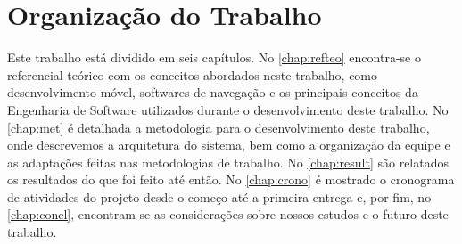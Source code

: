 \section{Organização do Trabalho}

Este trabalho está dividido em seis capítulos. No \autoref{chap:refteo} encontra-se o referencial teórico com os conceitos abordados neste trabalho, como desenvolvimento móvel, softwares de navegação e os principais conceitos da Engenharia de Software utilizados durante o desenvolvimento deste trabalho. No \autoref{chap:met} é detalhada a metodologia para o desenvolvimento deste trabalho, onde descrevemos a arquitetura do sistema, bem como a organização da equipe e as adaptações feitas nas metodologias de trabalho. No \autoref{chap:result} são relatados os resultados do que foi feito até então. No \autoref{chap:crono} é mostrado o cronograma de atividades do projeto desde o começo até a primeira entrega e, por fim, no \autoref{chap:concl}, encontram-se as considerações sobre nossos estudos e o futuro deste trabalho.

